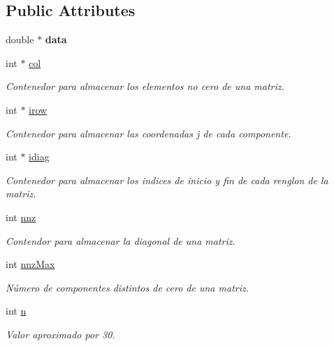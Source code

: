 \subsection*{Public Attributes}
\begin{DoxyCompactItemize}
\item 
\hypertarget{class_c_s_r_ab79698a53771a4a8ee5f5d9baf5b5f34}{}\label{class_c_s_r_ab79698a53771a4a8ee5f5d9baf5b5f34} 
double $\ast$ {\bfseries data}
\item 
\hypertarget{class_c_s_r_a699cc5089afab7eca88ce6099c3b1241}{}\label{class_c_s_r_a699cc5089afab7eca88ce6099c3b1241} 
int $\ast$ \hyperlink{class_c_s_r_a699cc5089afab7eca88ce6099c3b1241}{col}
\begin{DoxyCompactList}\small\item\em Contenedor para almacenar los elementos no cero de una matriz. \end{DoxyCompactList}\item 
\hypertarget{class_c_s_r_a86be7b1c810d67bc8dea34c97dbeaf21}{}\label{class_c_s_r_a86be7b1c810d67bc8dea34c97dbeaf21} 
int $\ast$ \hyperlink{class_c_s_r_a86be7b1c810d67bc8dea34c97dbeaf21}{irow}
\begin{DoxyCompactList}\small\item\em Contenedor para almacenar las coordenadas j de cada componente. \end{DoxyCompactList}\item 
\hypertarget{class_c_s_r_aa2cba52780d8f58cf2bc89d282e23fb5}{}\label{class_c_s_r_aa2cba52780d8f58cf2bc89d282e23fb5} 
int $\ast$ \hyperlink{class_c_s_r_aa2cba52780d8f58cf2bc89d282e23fb5}{idiag}
\begin{DoxyCompactList}\small\item\em Contenedor para almacenar los indices de inicio y fin de cada renglon de la matriz. \end{DoxyCompactList}\item 
\hypertarget{class_c_s_r_a05a5776187d775d8bf6757521e1b9f06}{}\label{class_c_s_r_a05a5776187d775d8bf6757521e1b9f06} 
int \hyperlink{class_c_s_r_a05a5776187d775d8bf6757521e1b9f06}{nnz}
\begin{DoxyCompactList}\small\item\em Contendor para almacenar la diagonal de una matriz. \end{DoxyCompactList}\item 
\hypertarget{class_c_s_r_adec85ce4eb2b178193284da1ace46f8e}{}\label{class_c_s_r_adec85ce4eb2b178193284da1ace46f8e} 
int \hyperlink{class_c_s_r_adec85ce4eb2b178193284da1ace46f8e}{nnz\+Max}
\begin{DoxyCompactList}\small\item\em Número de componentes distintos de cero de una matriz. \end{DoxyCompactList}\item 
\hypertarget{class_c_s_r_ae773c87e3f55fa8af05a982b62dc471a}{}\label{class_c_s_r_ae773c87e3f55fa8af05a982b62dc471a} 
int \hyperlink{class_c_s_r_ae773c87e3f55fa8af05a982b62dc471a}{n}
\begin{DoxyCompactList}\small\item\em Valor aproximado por 30. \end{DoxyCompactList}\end{DoxyCompactItemize}


